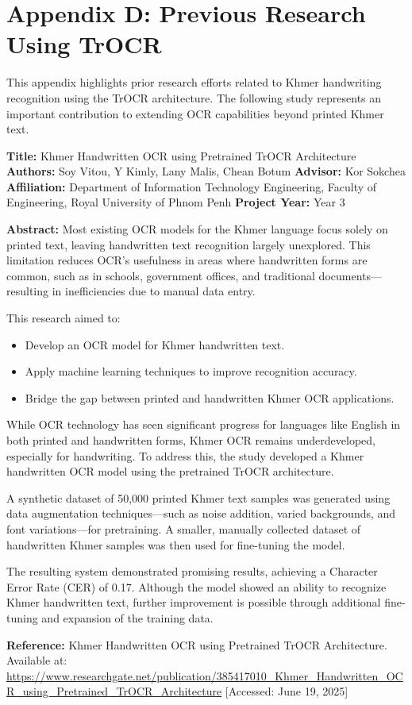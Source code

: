 \clearpage
{}
\label{appendix-d}
\section*{Appendix D: Previous Research Using TrOCR}

This appendix highlights prior research efforts related to Khmer handwriting recognition using the TrOCR architecture. The following study represents an important contribution to extending OCR capabilities beyond printed Khmer text.

\vspace{0.3cm}

\textbf{Title:} Khmer Handwritten OCR using Pretrained TrOCR Architecture  
\textbf{Authors:} Soy Vitou, Y Kimly, Lany Malis, Chean Botum  
\textbf{Advisor:} Kor Sokchea  
\textbf{Affiliation:} Department of Information Technology Engineering, Faculty of Engineering, Royal University of Phnom Penh  
\textbf{Project Year:} Year 3

\vspace{0.3cm}

\textbf{Abstract:}  
Most existing OCR models for the Khmer language focus solely on printed text, leaving handwritten text recognition largely unexplored. This limitation reduces OCR's usefulness in areas where handwritten forms are common, such as in schools, government offices, and traditional documents—resulting in inefficiencies due to manual data entry.

This research aimed to:
\begin{itemize}
    \item Develop an OCR model for Khmer handwritten text.
    \item Apply machine learning techniques to improve recognition accuracy.
    \item Bridge the gap between printed and handwritten Khmer OCR applications.
\end{itemize}

While OCR technology has seen significant progress for languages like English in both printed and handwritten forms, Khmer OCR remains underdeveloped, especially for handwriting. To address this, the study developed a Khmer handwritten OCR model using the pretrained TrOCR architecture.

A synthetic dataset of 50,000 printed Khmer text samples was generated using data augmentation techniques—such as noise addition, varied backgrounds, and font variations—for pretraining. A smaller, manually collected dataset of handwritten Khmer samples was then used for fine-tuning the model.

The resulting system demonstrated promising results, achieving a Character Error Rate (CER) of 0.17. Although the model showed an ability to recognize Khmer handwritten text, further improvement is possible through additional fine-tuning and expansion of the training data.

\vspace{0.3cm}

\textbf{Reference:}  
Khmer Handwritten OCR using Pretrained TrOCR Architecture.  
Available at: \url{https://www.researchgate.net/publication/385417010_Khmer_Handwritten_OCR_using_Pretrained_TrOCR_Architecture}  
[Accessed: June 19, 2025]